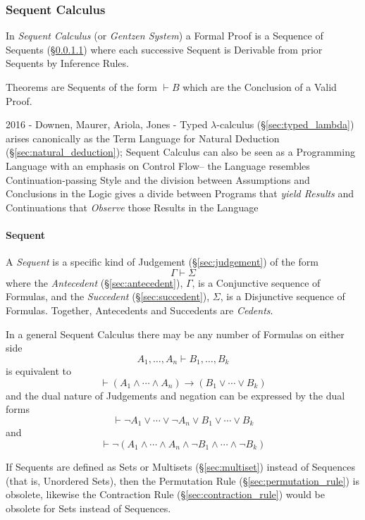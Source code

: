 \subsubsection{Sequent Calculus}\label{sec:sequent_calculus}

In \emph{Sequent Calculus} (or \emph{Gentzen System}) a Formal Proof
is a Sequence of Sequents (\S\ref{sec:sequent}) where each
successive Sequent is Derivable from prior Sequents by Inference
Rules.

Theorems are Sequents of the form $\vdash B$ which are the Conclusion
of a Valid Proof.

2016 - Downen, Maurer, Ariola, Jones - Typed $\lambda$-calculus
(\S\ref{sec:typed_lambda}) arises canonically as the Term Language for Natural
Deduction (\S\ref{sec:natural_deduction}); Sequent Calculus can also be seen as
a Programming Language with an emphasis on Control Flow-- the Language
resembles Continuation-passing Style and the division between Assumptions and
Conclusions in the Logic gives a divide between Programs that \emph{yield
  Results} and Continuations that \emph{Observe} those Results in the Language



\paragraph{Sequent}\label{sec:sequent}\hfill

A \emph{Sequent} is a specific kind of Judgement
(\S\ref{sec:judgement}) of the form
\[
  \Gamma \vdash \Sigma
\]
where the \emph{Antecedent} (\S\ref{sec:antecedent}), $\Gamma$, is a
Conjunctive sequence of Formulas, and the \emph{Succedent}
(\S\ref{sec:succedent}), $\Sigma$, is a Disjunctive sequence of
Formulas. Together, Antecedents and Succedents are \emph{Cedents}.

In a general Sequent Calculus there may be any number of Formulas on
either side
\[
  A_1, \ldots, A_n \vdash B_1, \ldots, B_k
\]
is equivalent to
\[
  \vdash(A_1 \wedge \cdots \wedge A_n) \rightarrow
  (B_1 \vee \cdots \vee B_k)
\]
and the dual nature of Judgements and negation can be expressed by the
dual forms
\[
  \vdash \neg A_1 \vee \cdots \vee \neg A_n \vee B_1 \vee \cdots
  \vee B_k
\]
and
\[
  \vdash \neg(A_1 \wedge \cdots \wedge A_n \wedge \neg B_1 \wedge
  \cdots \wedge \neg B_k)
\]

If Sequents are defined as Sets or Multisets (\S\ref{sec:multiset})
instead of Sequences (that is, Unordered Sets), then the Permutation
Rule (\S\ref{sec:permutation_rule}) is obsolete, likewise the
Contraction Rule (\S\ref{sec:contraction_rule}) would be obsolete for
Sets instead of Sequences.



